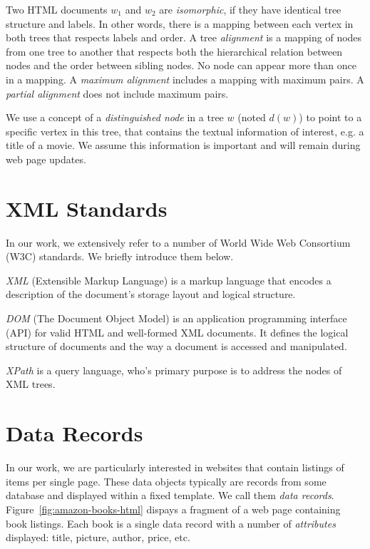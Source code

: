 Two HTML documents $w_1$ and $w_2$ are \emph{isomorphic}, if they have identical tree structure and labels. In other words, there is a mapping between each vertex in both trees that respects labels and order. A tree \emph{alignment} is a mapping of nodes from one tree to another that respects both the hierarchical relation between nodes and the order between sibling nodes. No node can appear more than once in a mapping. A \emph{maximum alignment} includes a mapping with maximum pairs. A \emph{partial alignment} does not include maximum pairs.

We use a concept of a \emph{distinguished node} in a tree $w$ (noted $d(w)$) to point to a specific vertex in this tree, that contains the textual information of interest, e.g. a title of a movie. We assume this information is important and will remain during web page updates.


\section{XML Standards}

In our work, we extensively refer to a number of World Wide Web Consortium (W3C) standards. We briefly introduce them below.

\emph{XML} (Extensible Markup Language) is a markup language that encodes a description of the document's storage layout and logical structure. \cite{w3c:xml}

\emph{DOM} (The Document Object Model) is an application programming interface (API) for valid HTML and well-formed XML documents. It defines the logical structure of documents and the way a document is accessed and manipulated. \cite{w3c:dom}

\emph{XPath} is a query language, who's primary purpose is to address the nodes of XML trees. \cite{w3c:xpath}


\section{Data Records}

In our work, we are particularly interested in websites that contain listings of items per single page. These data objects typically are records from some database and displayed within a fixed template. We call them \emph{data records}. Figure~\ref{fig:amazon-books-html} dispays a fragment of a web page containing book listings. Each book is a single data record with a number of \emph{attributes} displayed: title, picture, author, price, etc.

